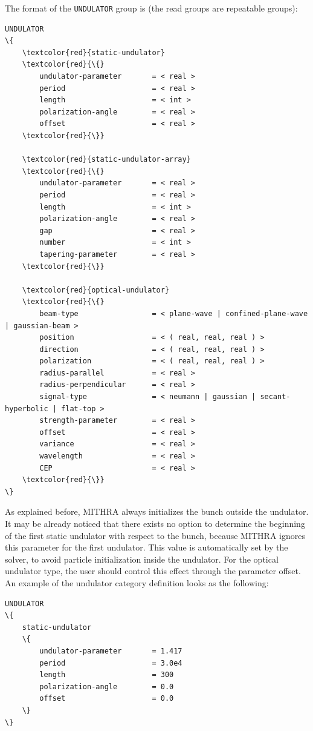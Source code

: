 The format of the \texttt{UNDULATOR} group is (the read groups are repeatable groups):
%
\begin{Verbatim}[frame=single, fontsize=\small, tabsize=4, fontfamily=courier, fontseries=b, commandchars=\\\{\}, obeytabs]
UNDULATOR
\{
	\textcolor{red}{static-undulator}
	\textcolor{red}{\{}
		undulator-parameter		  = < real >
		period					  = < real >
		length					  = < int >
		polarization-angle		  = < real >
		offset					  = < real >
	\textcolor{red}{\}}

	\textcolor{red}{static-undulator-array}
	\textcolor{red}{\{}
		undulator-parameter		  = < real >
		period					  = < real >
		length					  = < int >
		polarization-angle		  = < real >
		gap						  = < real >
		number					  = < int >
		tapering-parameter		  = < real >
	\textcolor{red}{\}}

	\textcolor{red}{optical-undulator}
	\textcolor{red}{\{}
		beam-type				  = < plane-wave | confined-plane-wave | gaussian-beam >
		position				  = < ( real, real, real ) >
		direction				  = < ( real, real, real ) >
		polarization			  = < ( real, real, real ) >
		radius-parallel			  = < real >
		radius-perpendicular	  = < real >
		signal-type				  = < neumann | gaussian | secant-hyperbolic | flat-top >
		strength-parameter		  = < real >
		offset					  = < real >
		variance				  = < real >
		wavelength				  = < real >
		CEP						  = < real >
	\textcolor{red}{\}}
\}
\end{Verbatim}
%
As explained before, MITHRA always initializes the bunch outside the undulator.
%
It may be already noticed that there exists no option to determine the beginning of the first static undulator with respect to the bunch, because MITHRA ignores this parameter for the first undulator.
%
This value is automatically set by the solver, to avoid particle initialization inside the undulator.
%
For the optical undulator type, the user should control this effect through the parameter offset.
%
An example of the undulator category definition looks as the following:
%
\begin{snugshade}
\begin{Verbatim}[fontsize=\small, tabsize=4, fontfamily=courier, fontseries=b, commandchars=\\\{\}, obeytabs]
UNDULATOR
\{
	static-undulator
	\{
		undulator-parameter		  = 1.417
    	period					  = 3.0e4
    	length					  = 300
    	polarization-angle		  = 0.0
    	offset					  = 0.0
    \}
\}
\end{Verbatim}
\end{snugshade}
